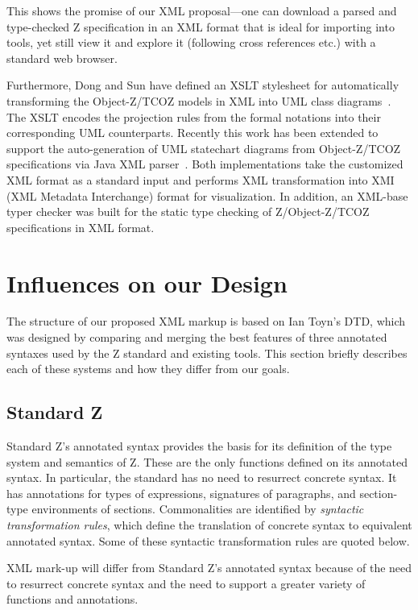 \documentclass{llncs}  %
\begin{document}
This shows the promise of our XML proposal---one can download a parsed
and type-checked Z specification in an XML format that is ideal for
importing into tools, yet still view it and explore it (following
cross references etc.) with a standard web browser.

Furthermore, Dong and Sun have defined an XSLT stylesheet for
automatically transforming the Object-Z/TCOZ models in XML into UML
class diagrams~\cite{sun01www}. The XSLT encodes the projection rules
from the formal notations into their corresponding UML
counterparts. Recently this work has been extended to support the
auto-generation of UML statechart diagrams from Object-Z/TCOZ
specifications via Java XML parser~\cite{dong02icfem}. Both
implementations take the customized XML format as a standard input and
performs XML transformation into XMI (XML Metadata Interchange) format
for visualization. In addition, an XML-base typer checker was built
for the static type checking of Z/Object-Z/TCOZ specifications in XML
format.


\section{Influences on our Design}

The structure of our proposed XML markup is based on Ian Toyn's DTD,
which was designed by comparing and merging the best features
of three annotated syntaxes used by the Z standard and existing tools.
This section briefly describes each of these systems and how they
differ from our goals.

\subsection{Standard Z}

Standard Z's annotated syntax provides the basis for its definition
of the type system and semantics of Z.
These are the only functions defined on its annotated syntax.
In particular, the standard has no need to resurrect concrete syntax.
It has annotations for types of expressions,
signatures of paragraphs, and section-type environments of sections.
Commonalities are identified by \textit{syntactic transformation rules},
which define the translation of concrete syntax to equivalent annotated syntax.
Some of these syntactic transformation rules are quoted below.

XML mark-up will differ from Standard Z's annotated syntax
because of the need to resurrect concrete syntax
and the need to support a greater variety of functions and annotations.
\end{document}

